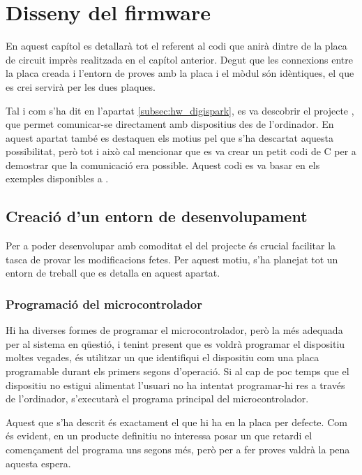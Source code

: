 \chapter{Disseny del firmware}

En aquest capítol es detallarà tot el referent al codi que anirà dintre de la
placa de circuit imprès realitzada en el capítol anterior. Degut que les
connexions entre la placa creada i l'entorn de proves amb la placa 
i el mòdul  són idèntiques, el  que es crei servirà
per les dues plaques.

Tal i com s'ha dit en l'apartat \ref{subsec:hw_digispark}, es va descobrir
el projecte , que permet comunicar-se directament amb
dispositius  des de l'ordinador. En aquest apartat també es destaquen
els motius pel que s'ha descartat aquesta possibilitat, però tot i això cal
mencionar que es va crear un petit codi de C per a demostrar que la comunicació
era possible. Aquest codi es va basar en els exemples disponibles a
\cite{I2cTinyUsb}.

\section{Creació d'un entorn de desenvolupament}

Per a poder desenvolupar amb comoditat el  del projecte és crucial
facilitar la tasca de provar les modificacions fetes. Per aquest motiu, s'ha
planejat tot un entorn de treball que es detalla en aquest apartat.

\subsection{Programació del microcontrolador}
\label{subsec:bootloader}

Hi ha diverses formes de programar el microcontrolador, però la més adequada
per al sistema en qüestió, i tenint present que es voldrà programar el dispositiu
moltes vegades, és utilitzar un  que identifiqui el dispositiu
com una placa programable durant els primers segons d'operació. Si al cap de
poc temps que el dispositiu no estigui alimentat l'usuari no ha intentat
programar-hi res a través de l'ordinador, s'executarà el programa principal
del microcontrolador.

Aquest  que s'ha descrit és exactament el que hi ha en la
placa  per defecte. Com és evident, en un producte definitiu no
interessa posar un  que retardi el començament del programa
uns segons més, però per a fer proves valdrà la pena aquesta espera.

